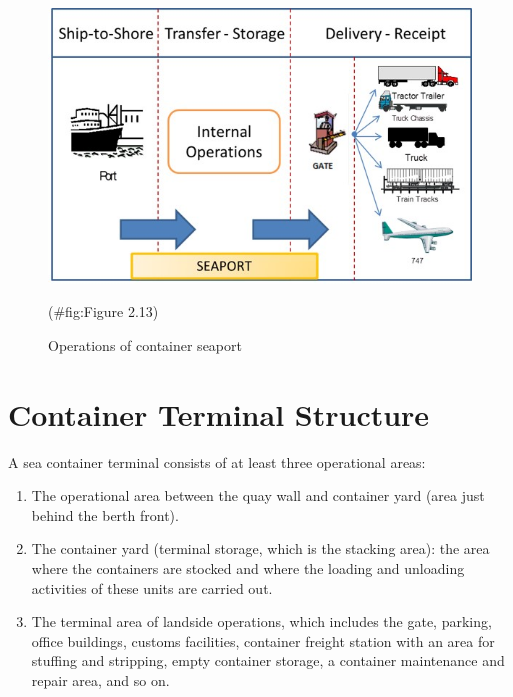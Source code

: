 \documentclass[
]{book}
\begin{document}
\begin{figure}

{\centering \includegraphics{./Images/Intro/Operations of container seaport} 

}

\caption{Operations of container seaport}(\#fig:Figure 2.13)
\end{figure}

\hypertarget{intro-container_terminal_structure}{%
\section{Container Terminal Structure}\label{intro-container_terminal_structure}}

A sea container terminal consists of at least three operational areas:

\begin{enumerate}
\def\labelenumi{\arabic{enumi})}
\item
  The operational area between the quay wall and container yard (area just behind the berth front).
\item
  The container yard (terminal storage, which is the stacking area): the area where the containers are stocked and where the loading and unloading activities of these units are carried out.
\item
  The terminal area of landside operations, which includes the gate, parking, office buildings, customs facilities, container freight station with an area for stuffing and stripping, empty container storage, a container maintenance and repair area, and so on.
\end{enumerate}
\end{document}
